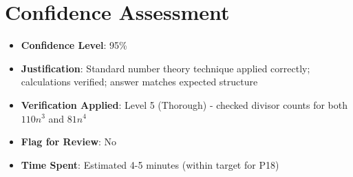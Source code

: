 \documentclass[]{article}
\begin{document}
\section*{Confidence Assessment}
\begin{itemize}[leftmargin=*]
    \item \textbf{Confidence Level}: 95\%
    \item \textbf{Justification}: Standard number theory technique applied correctly; calculations verified; answer matches expected structure
    \item \textbf{Verification Applied}: Level 5 (Thorough) - checked divisor counts for both $110n^3$ and $81n^4$
    \item \textbf{Flag for Review}: No
    \item \textbf{Time Spent}: Estimated 4-5 minutes (within target for P18)
\end{itemize}
\end{document}
